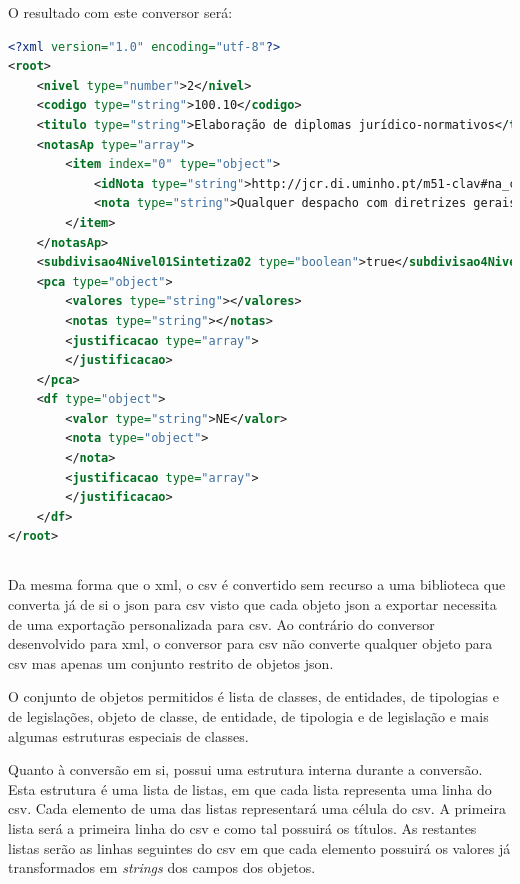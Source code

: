 O resultado com este conversor será:
\begin{lstlisting}[language=xml, caption=\acrshort{xml} resultante da conversão do \acrshort{json} presente em~\ref{exem:json}]
<?xml version="1.0" encoding="utf-8"?>
<root>
    <nivel type="number">2</nivel>
    <codigo type="string">100.10</codigo>
    <titulo type="string">Elaboração de diplomas jurídico-normativos</titulo>
    <notasAp type="array">
        <item index="0" type="object">
            <idNota type="string">http://jcr.di.uminho.pt/m51-clav#na_c100.10_MRIKl-RBu_2sz5u9FzPqH</idNota>
            <nota type="string">Qualquer despacho com diretrizes gerais e abstratas</nota>
        </item>
    </notasAp>
    <subdivisao4Nivel01Sintetiza02 type="boolean">true</subdivisao4Nivel01Sintetiza02>
    <pca type="object">
        <valores type="string"></valores>
        <notas type="string"></notas>
        <justificacao type="array">
        </justificacao>
    </pca>
    <df type="object">
        <valor type="string">NE</valor>
        <nota type="object">
        </nota>
        <justificacao type="array">
        </justificacao>
    </df>
</root>
\end{lstlisting}

\subsection{}

Da mesma forma que o \acrshort{xml}, o \acrshort{csv} é convertido sem recurso a uma biblioteca que converta já de si o \acrshort{json} para \acrshort{csv} visto que cada objeto \acrshort{json} a exportar necessita de uma exportação personalizada para \acrshort{csv}. Ao contrário do conversor desenvolvido para \acrshort{xml}, o conversor para \acrshort{csv} não converte qualquer objeto para \acrshort{csv} mas apenas um conjunto restrito de objetos \acrshort{json}.

O conjunto de objetos permitidos é lista de classes, de entidades, de tipologias e de legislações, objeto de classe, de entidade, de tipologia e de legislação e mais algumas estruturas especiais de classes.

Quanto à conversão em si, possui uma estrutura interna durante a conversão. Esta estrutura é uma lista de listas, em que cada lista representa uma linha do \acrshort{csv}. Cada elemento de uma das listas representará uma célula do \acrshort{csv}. A primeira lista será a primeira linha do \acrshort{csv} e como tal possuirá os títulos. As restantes listas serão as linhas seguintes do \acrshort{csv} em que cada elemento possuirá os valores já transformados em \textit{strings} dos campos dos objetos.

